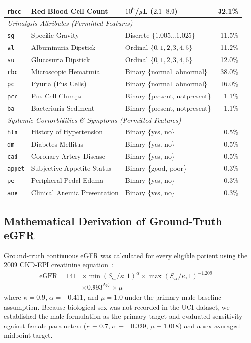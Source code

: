 \documentclass[10pt,conference]{IEEEtran}
\begin{document}
\begin{table}[htbp]
\begin{tabularx}{\columnwidth}{llp{2.3cm}r}
\texttt{rbcc} & Red Blood Cell Count & $10^6$/$\mu$L ($2.1$--$8.0$) & 32.1\% \\
\midrule
\multicolumn{4}{l}{\textit{Urinalysis Attributes (Permitted Features)}} \\
\texttt{sg} & Specific Gravity & Discrete $\{1.005 \dots 1.025\}$ & 11.5\% \\
\texttt{al} & Albuminuria Dipstick & Ordinal $\{0, 1, 2, 3, 4, 5\}$ & 11.2\% \\
\texttt{su} & Glucosuria Dipstick & Ordinal $\{0, 1, 2, 3, 4, 5\}$ & 12.0\% \\
\texttt{rbc} & Microscopic Hematuria & Binary \{normal, abnormal\} & 38.0\% \\
\texttt{pc} & Pyuria (Pus Cells) & Binary \{normal, abnormal\} & 16.0\% \\
\texttt{pcc} & Pus Cell Clumps & Binary \{present, notpresent\} & 1.1\% \\
\texttt{ba} & Bacteriuria Sediment & Binary \{present, notpresent\} & 1.1\% \\
\midrule
\multicolumn{4}{l}{\textit{Systemic Comorbidities \& Symptoms (Permitted Features)}} \\
\texttt{htn} & History of Hypertension & Binary \{yes, no\} & 0.5\% \\
\texttt{dm} & Diabetes Mellitus & Binary \{yes, no\} & 0.5\% \\
\texttt{cad} & Coronary Artery Disease & Binary \{yes, no\} & 0.5\% \\
\texttt{appet} & Subjective Appetite Status & Binary \{good, poor\} & 0.3\% \\
\texttt{pe} & Peripheral Pedal Edema & Binary \{yes, no\} & 0.3\% \\
\texttt{ane} & Clinical Anemia Presentation & Binary \{yes, no\} & 0.3\% \\
\bottomrule
\end{tabularx}
\end{table}

\subsection{Mathematical Derivation of Ground-Truth eGFR}
Ground-truth continuous eGFR was calculated for every eligible patient using the 2009 CKD-EPI creatinine equation~\cite{levey2009new}:
\begin{equation}
\begin{split}
\text{eGFR} = 141 & \times \min(S_{\text{cr}}/\kappa, 1)^\alpha \times \max(S_{\text{cr}}/\kappa, 1)^{-1.209} \\
& \times 0.993^{\text{Age}} \times \mu
\end{split}
\label{eq:ckd_epi}
\end{equation}
where $\kappa = 0.9$, $\alpha = -0.411$, and $\mu = 1.0$ under the primary male baseline assumption. Because biological sex was not recorded in the UCI dataset, we established the male formulation as the primary target and evaluated sensitivity against female parameters ($\kappa = 0.7$, $\alpha = -0.329$, $\mu = 1.018$) and a sex-averaged midpoint target.
\end{document}
